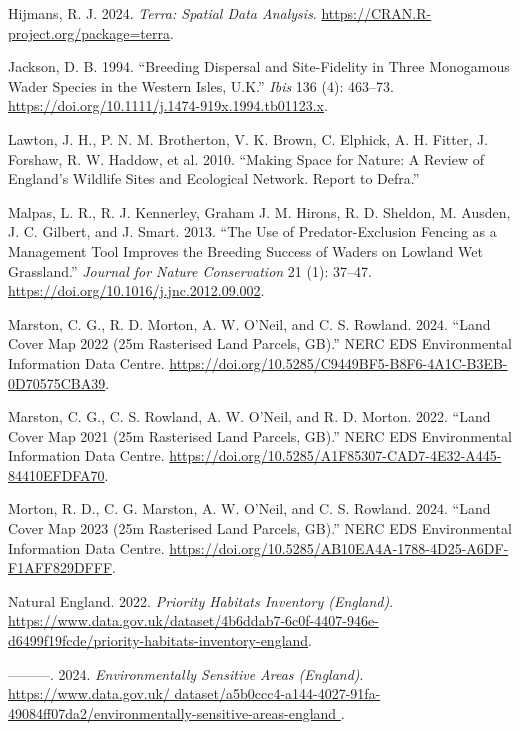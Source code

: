 \documentclass[
  12pt,
  letterpaper,
  DIV=11,
  numbers=noendperiod]{scrartcl}
\newlength{\cslhangindent}
\newenvironment{CSLReferences}[2] %
 {\begin{list}{}{%
  \setlength{\itemindent}{0pt}
  \setlength{\leftmargin}{0pt}
  \setlength{\parsep}{0pt}
  \ifodd #1
   \setlength{\leftmargin}{\cslhangindent}
   \setlength{\itemindent}{-1\cslhangindent}
  \fi
  \setlength{\itemsep}{#2\baselineskip}}}
 {\end{list}}
\begin{document}
\begin{CSLReferences}{1}{0}
Hijmans, R. J. 2024. \emph{Terra: Spatial Data Analysis}.
\url{https://CRAN.R-project.org/package=terra}.

Jackson, D. B. 1994. {``Breeding Dispersal and Site{-}Fidelity in Three
Monogamous Wader Species in the Western Isles, U.K.''} \emph{Ibis} 136
(4): 463--73. \url{https://doi.org/10.1111/j.1474-919x.1994.tb01123.x}.

Lawton, J. H., P. N. M. Brotherton, V. K. Brown, C. Elphick, A. H.
Fitter, J. Forshaw, R. W. Haddow, et al. 2010. {``Making Space for
Nature: A Review of England's Wildlife Sites and Ecological Network.
Report to Defra.''}

Malpas, L. R., R. J. Kennerley, Graham J. M. Hirons, R. D. Sheldon, M.
Ausden, J. C. Gilbert, and J. Smart. 2013. {``The Use of
Predator-Exclusion Fencing as a Management Tool Improves the Breeding
Success of Waders on Lowland Wet Grassland.''} \emph{Journal for Nature
Conservation} 21 (1): 37--47.
\url{https://doi.org/10.1016/j.jnc.2012.09.002}.

Marston, C. G., R. D. Morton, A. W. O'Neil, and C. S. Rowland. 2024.
{``Land Cover Map 2022 (25m Rasterised Land Parcels, GB).''} NERC EDS
Environmental Information Data Centre.
\url{https://doi.org/10.5285/C9449BF5-B8F6-4A1C-B3EB-0D70575CBA39}.

Marston, C. G., C. S. Rowland, A. W. O'Neil, and R. D. Morton. 2022.
{``Land Cover Map 2021 (25m Rasterised Land Parcels, GB).''} NERC EDS
Environmental Information Data Centre.
\url{https://doi.org/10.5285/A1F85307-CAD7-4E32-A445-84410EFDFA70}.

Morton, R. D., C. G. Marston, A. W. O'Neil, and C. S. Rowland. 2024.
{``Land Cover Map 2023 (25m Rasterised Land Parcels, GB).''} NERC EDS
Environmental Information Data Centre.
\url{https://doi.org/10.5285/AB10EA4A-1788-4D25-A6DF-F1AFF829DFFF}.

Natural England. 2022. \emph{Priority Habitats Inventory (England)}.
\url{https://www.data.gov.uk/dataset/4b6ddab7-6c0f-4407-946e-d6499f19fcde/priority-habitats-inventory-england}.

---------. 2024. \emph{Environmentally Sensitive Areas (England)}.
\href{https://www.data.gov.uk/\%20dataset/a5b0ccc4-a144-4027-91fa-49084ff07da2/environmentally-sensitive-areas-england\%20}{https://www.data.gov.uk/
dataset/a5b0ccc4-a144-4027-91fa-49084ff07da2/environmentally-sensitive-areas-england
}.


\end{CSLReferences}
\end{document}
